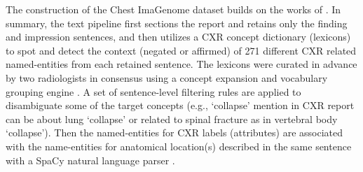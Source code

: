 
The construction of the Chest ImaGenome dataset builds on the works of \cite{wu2020ai,wu2020automatic}. In summary, the text pipeline \cite{wu2020ai} first sections the report and retains only the finding and impression sentences, and then utilizes a CXR concept dictionary (lexicons) to spot and detect the context (negated or affirmed) of 271 different CXR related named-entities from each retained sentence. The lexicons were curated in advance by two radiologists in consensus using a concept expansion and vocabulary grouping engine \cite{coden2012spot}. A set of sentence-level filtering rules are applied to disambiguate some of the target concepts (e.g., `collapse' mention in CXR report can be about lung `collapse' or related to spinal fracture as in vertebral body `collapse'). Then the named-entities for CXR labels (attributes) are associated with the name-entities for anatomical location(s) described in the same sentence with a SpaCy natural language parser \cite{spacy}. 

